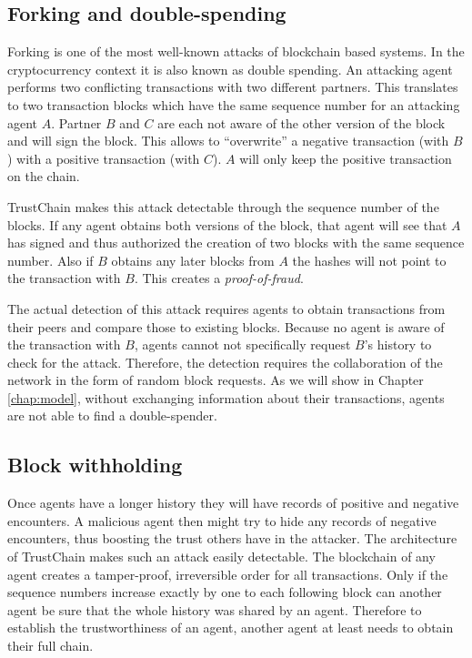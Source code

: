 \subsection{Forking and double-spending}
Forking is one of the most well-known attacks of blockchain based systems. In the cryptocurrency 
context it is also known as double spending. An attacking agent 
performs two conflicting transactions with two different partners. This translates to two transaction
blocks which have the same sequence number for an attacking agent $A$. Partner $B$ and $C$ are each
not aware of the other version of the block and will sign the block. This allows to ``overwrite''
a negative transaction (with $B$) with a positive transaction (with $C$). $A$ will only keep the positive transaction on 
the chain. 

TrustChain makes this attack detectable through the sequence number of the blocks. If any agent 
obtains both versions of the block, that agent will see that $A$ has signed and thus authorized the
creation of two blocks with the same sequence number. Also if $B$ obtains any later blocks from $A$ 
the hashes will not point to the transaction with $B$.  This creates a \textit{proof-of-fraud}. 

The actual
detection of this attack requires agents to obtain transactions from their peers and compare those 
to existing blocks. Because no agent is aware of the transaction with $B$, agents cannot not specifically 
request $B$'s history to check for the attack. Therefore, the detection requires the collaboration
of the network in the form of random block requests. As we will show in Chapter \ref{chap:model}, 
without exchanging information about their transactions, agents are not able to find a double-spender.

\subsection{Block withholding}
Once agents have a longer history they will have records of positive and negative encounters. A 
malicious agent then might try to hide any records of negative encounters, thus boosting the trust 
others have in the attacker. The architecture of TrustChain makes such an attack easily detectable.
The blockchain of any agent creates a tamper-proof, irreversible order for all transactions. Only if
the sequence numbers increase exactly by one to each following block can another agent be sure that 
the whole history was shared by an agent. Therefore to establish the trustworthiness of an agent, 
another agent at least needs to obtain their full chain.

